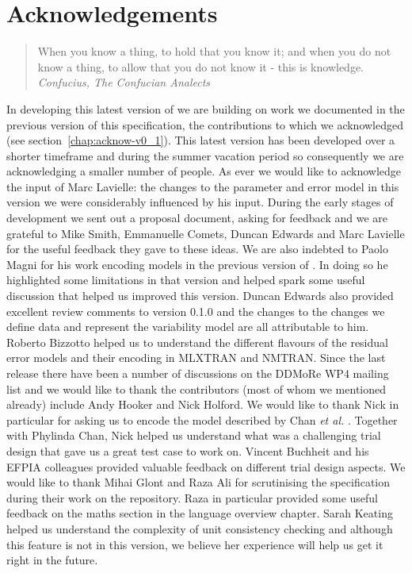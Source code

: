 \chapter*{Acknowledgements}

 \begin{quote}
{\small
When you know a thing, to hold that you know it; and when you do not know a thing, to allow that you do not know it - this is knowledge.\\
\textit{Confucius, The Confucian Analects}}
\end{quote}

In developing this latest version of \pharmml we are building on work
we documented in the previous version of this specification, the
contributions to which we acknowledged (see
section~\ref{chap:acknow-v0_1}). This latest version has been
developed over a shorter timeframe and during the summer vacation
period so consequently we are acknowledging a smaller number of
people. As ever we would like to acknowledge the input of Marc
Lavielle: the changes to the parameter and error model in this version
we were considerably influenced by his input. During the early stages
of development we sent out a proposal document, asking for feedback
and we are grateful to Mike Smith, Emmanuelle Comets, Duncan Edwards
and Marc Lavielle for the useful feedback they gave to these ideas. We
are also indebted to Paolo Magni for his work encoding models in the
previous version of \pharmml. In doing so he highlighted some
limitations in that version and helped spark some useful discussion
that helped us improved this version. Duncan Edwards also provided
excellent review comments to version 0.1.0 and the changes to the
changes we define data and represent the variability model are all
attributable to him. Roberto Bizzotto helped us to understand the
different flavours of the residual error models and their encoding in
MLXTRAN and NMTRAN. Since the last release there have been a number of
discussions on the DDMoRe WP4 mailing list and we would like to thank
the contributors (most of whom we mentioned already) include Andy
Hooker and Nick Holford. We would like to thank Nick in particular for
asking us to encode the model described by Chan \emph{et al.}\xspace
\cite{Chan:2005fk}. Together with Phylinda Chan, Nick helped us
understand what was a challenging trial design that gave us a great
test case to work on. Vincent Buchheit and his EFPIA colleagues
provided valuable feedback on different trial design aspects.  We
would like to thank Mihai Glont and Raza Ali for
scrutinising the specification during their work on the \ddmore
repository. Raza in particular provided some useful feedback on the
maths section in the language overview chapter. Sarah Keating helped
us understand the complexity of unit consistency checking and although
this feature is not in this version, we believe her experience will
help us get it right in the future.

